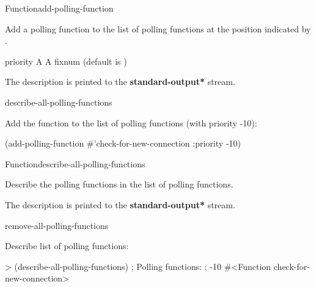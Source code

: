 \documentclass[10pt,twoside,english,pdftex]{article}
\begin{document}
\begin{functiondoc}{Function}{add-polling-function}%
  {  }
%

\fnsyntax 

\fnpurpose Add a polling function to the list of polling functions at the
position indicated by .

\fnpackage {}

\fnmodule {}

\fnargs
\begin{args}{priority}
\arg[function] A 
\arg[priority] A fixnum (default is )
\end{args}

\fndescription
{}%
The description is printed to the {\bf *standard-output*} stream.

\begin{alsos}{describe-all-polling-functions}
\end{alsos}

\fnexample
Add the function  to the list of polling 
functions (with priority -10):
\begin{example}
  (add-polling-function #'check-for-new-connection
     :priority -10)
\end{example}

\end{functiondoc}


\begin{functiondoc}{Function}{describe-all-polling-functions}{\noargs}
%
%

\fnsyntax 

\fnpurpose Describe the polling functions in the list of polling functions.

\fnpackage {}

\fnmodule {}

\fndescription
{}%
The description is printed to the {\bf *standard-output*} stream.

\begin{alsos}{remove-all-polling-functions}
\end{alsos}

\fnexample
Describe list of polling functions:
\begin{example}
> (describe-all-polling-functions)
; Polling functions:
;    -10 #<Function check-for-new-connection>
\end{example}

\end{functiondoc}
\end{document}
